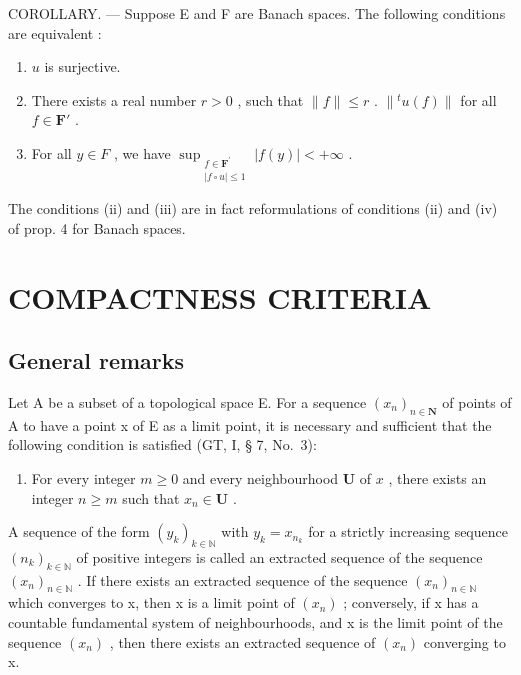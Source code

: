 COROLLARY. --- Suppose E and F are Banach spaces. The following conditions are equivalent :

\begin{enumerate}
\def\labelenumi{(\roman{enumi})}
\item
  \(u\) is surjective.
\item
  There exists a real number \(r > 0\) , such that \(\| f \| \leqslant r\) . \(\| {}^t u(f) \|\) for all \(f \in \mathbf{F}'\) .
\item
  For all \(y \in F\) , we have \(\sup_{\substack{f\in \mathbf{F}^{\prime}\\ |f\circ u|\leqslant 1}} |f(y)| < +\infty\) .
\end{enumerate}

The conditions (ii) and (iii) are in fact reformulations of conditions (ii) and (iv) of prop. 4 for Banach spaces.

\section{COMPACTNESS CRITERIA}

\subsection{General remarks}

Let A be a subset of a topological space E. For a sequence \((x_{n})_{n\in\mathbf{N}}\) of points of A to have a point x of E as a limit point, it is necessary and sufficient that the following condition is satisfied (GT, I, § 7, No.~3):

\begin{enumerate}
\def\labelenumi{(\Alph{enumi})}
\tightlist
\item
  For every integer \(m \geqslant 0\) and every neighbourhood \(\mathbf{U}\) of \(x\) , there exists an integer \(n \geqslant m\) such that \(x_{n} \in \mathbf{U}\) .
\end{enumerate}

A sequence of the form \((y_{k})_{k\in\mathbb{N}}\) with \(y_{k}=x_{n_{k}}\) for a strictly increasing sequence \((n_{k})_{k\in\mathbb{N}}\) of positive integers is called an extracted sequence of the sequence \((x_{n})_{n\in\mathbb{N}}\) . If there exists an extracted sequence of the sequence \((x_{n})_{n\in\mathbb{N}}\) which converges to x, then x is a limit point of \((x_{n})\) ; conversely, if x has a countable fundamental system of neighbourhoods, and x is the limit point of the sequence \((x_{n})\) , then there exists an extracted sequence of \((x_{n})\) converging to x.

